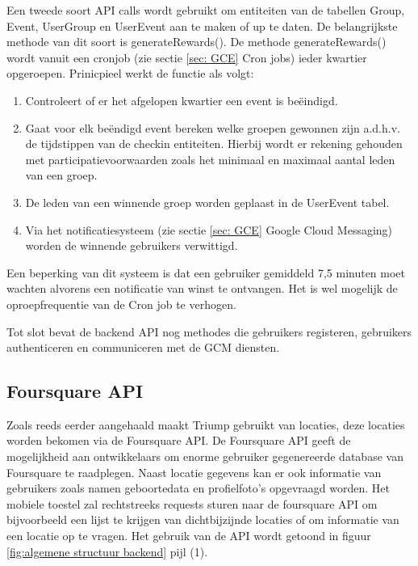 Een tweede soort API calls wordt gebruikt om entiteiten van de tabellen Group, Event, UserGroup en UserEvent aan te maken of up te daten. De belangrijkste methode van dit soort is generateRewards(). De methode generateRewards() wordt vanuit een cronjob (zie sectie \ref{sec: GCE} Cron jobs) ieder kwartier opgeroepen. Prinicpieel werkt de functie als volgt:
\begin{enumerate}
  \item Controleert of er het afgelopen kwartier een event is beëindigd.
  \item Gaat voor elk beëndigd event bereken welke groepen gewonnen zijn a.d.h.v. de tijdstippen van de checkin entiteiten. Hierbij wordt er rekening gehouden met participatievoorwaarden zoals het minimaal en maximaal aantal leden van een groep.
  \item De leden van een winnende groep worden geplaast in de UserEvent tabel.
  \item Via het notificatiesysteem (zie sectie \ref{sec: GCE} Google Cloud Messaging) worden de winnende gebruikers verwittigd.
\end{enumerate}
Een beperking van dit systeem is dat een gebruiker gemiddeld 7,5 minuten moet wachten alvorens een notificatie van winst te ontvangen. Het is wel mogelijk de oproepfrequentie van de Cron job te verhogen.

Tot slot bevat de backend API nog methodes die gebruikers registeren, gebruikers authenticeren en communiceren met de GCM diensten. 

\subsection{Foursquare API}
\label{Foursquare API}

Zoals reeds eerder aangehaald maakt Triump gebruikt van locaties, deze locaties worden bekomen via de Foursquare API. De Foursquare API geeft de mogelijkheid aan ontwikkelaars om enorme gebruiker gegenereerde database van Foursquare te raadplegen. Naast locatie gegevens kan er ook informatie van gebruikers zoals namen geboortedata en profielfoto's opgevraagd worden.  Het mobiele toestel zal rechtstreeks requests sturen naar de foursquare API om bijvoorbeeld een lijst te krijgen van dichtbijzijnde locaties of om informatie van een locatie op te vragen. Het gebruik van de API wordt getoond in figuur \ref{fig:algemene structuur backend} pijl (1).

